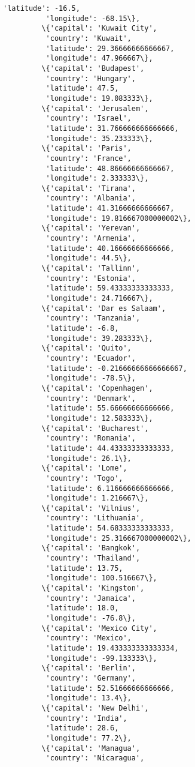 \documentclass[11pt]{article}
\begin{document}
\begin{Verbatim}[commandchars=\\\{\}]
          'latitude': -16.5,
          'longitude': -68.15\},
         \{'capital': 'Kuwait City',
          'country': 'Kuwait',
          'latitude': 29.36666666666667,
          'longitude': 47.966667\},
         \{'capital': 'Budapest',
          'country': 'Hungary',
          'latitude': 47.5,
          'longitude': 19.083333\},
         \{'capital': 'Jerusalem',
          'country': 'Israel',
          'latitude': 31.766666666666666,
          'longitude': 35.233333\},
         \{'capital': 'Paris',
          'country': 'France',
          'latitude': 48.86666666666667,
          'longitude': 2.333333\},
         \{'capital': 'Tirana',
          'country': 'Albania',
          'latitude': 41.31666666666667,
          'longitude': 19.816667000000002\},
         \{'capital': 'Yerevan',
          'country': 'Armenia',
          'latitude': 40.16666666666666,
          'longitude': 44.5\},
         \{'capital': 'Tallinn',
          'country': 'Estonia',
          'latitude': 59.43333333333333,
          'longitude': 24.716667\},
         \{'capital': 'Dar es Salaam',
          'country': 'Tanzania',
          'latitude': -6.8,
          'longitude': 39.283333\},
         \{'capital': 'Quito',
          'country': 'Ecuador',
          'latitude': -0.21666666666666667,
          'longitude': -78.5\},
         \{'capital': 'Copenhagen',
          'country': 'Denmark',
          'latitude': 55.66666666666666,
          'longitude': 12.583333\},
         \{'capital': 'Bucharest',
          'country': 'Romania',
          'latitude': 44.43333333333333,
          'longitude': 26.1\},
         \{'capital': 'Lome',
          'country': 'Togo',
          'latitude': 6.116666666666666,
          'longitude': 1.216667\},
         \{'capital': 'Vilnius',
          'country': 'Lithuania',
          'latitude': 54.68333333333333,
          'longitude': 25.316667000000002\},
         \{'capital': 'Bangkok',
          'country': 'Thailand',
          'latitude': 13.75,
          'longitude': 100.516667\},
         \{'capital': 'Kingston',
          'country': 'Jamaica',
          'latitude': 18.0,
          'longitude': -76.8\},
         \{'capital': 'Mexico City',
          'country': 'Mexico',
          'latitude': 19.433333333333334,
          'longitude': -99.133333\},
         \{'capital': 'Berlin',
          'country': 'Germany',
          'latitude': 52.51666666666666,
          'longitude': 13.4\},
         \{'capital': 'New Delhi',
          'country': 'India',
          'latitude': 28.6,
          'longitude': 77.2\},
         \{'capital': 'Managua',
          'country': 'Nicaragua',

\end{Verbatim}
\end{document}
